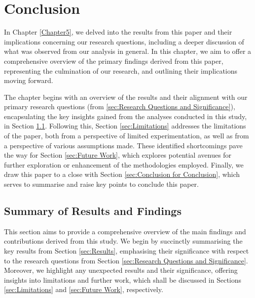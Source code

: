 
\chapter{Conclusion} %
\label{Chapter6} %

In Chapter \ref{Chapter5}, we delved into the results from this paper and their implications concerning our research questions, including a deeper discussion of what was observed from our analysis in general. In this chapter, we aim to offer a comprehensive overview of the primary findings derived from this paper, representing the culmination of our research, and outlining their implications moving forward.

The chapter begins with an overview of the results and their alignment with our primary research questions (from \ref{sec:Research Questions and Significance}), encapsulating the key insights gained from the analyses conducted in this study, in Section \ref{sec:Summary of Results and Findings}. Following this, Section \ref{sec:Limitations} addresses the limitations of the paper, both from a perspective of limited experimentation, as well as from a perspective of various assumptions made. These identified shortcomings pave the way for Section \ref{sec:Future Work}, which explores potential avenues for further exploration or enhancement of the methodologies employed. Finally, we draw this paper to a close with Section \ref{sec:Conclusion for Conclusion}, which serves to summarise and raise key points to conclude this paper. 


\section{Summary of Results and Findings}
\label{sec:Summary of Results and Findings}
    
This section aims to provide a comprehensive overview of the main findings and contributions derived from this study. We begin by succinctly summarising the key results from Section \ref{sec:Results}, emphasising their significance with respect to the research questions from Section \ref{sec:Research Questions and Significance}. Moreover, we highlight any unexpected results and their significance, offering insights into limitations and further work, which shall be discussed in Sections \ref{sec:Limitations} and \ref{sec:Future Work}, respectively.



